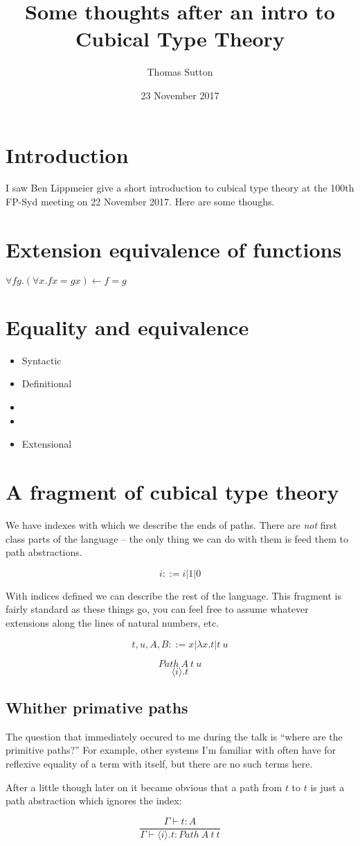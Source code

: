 \documentclass[a4paper]{article}
\title{Some thoughts after an intro to Cubical Type Theory}
\author{Thomas Sutton}
\date{23 November 2017}
\newcommand{\labs}[2]{{\lambda #1 . #2}}
\newcommand{\lapp}[2]{#1 \: #2}
\newcommand{\pabs}[2]{{\langle #1 \rangle}.{#2}}
\newcommand{\Path}[3]{{Path\:{#1}\:{#2}\:{#3}}}
\begin{document}
\maketitle

\section{Introduction}
I saw Ben Lippmeier give a short introduction to cubical type
theory\cite{DBLP:journals/corr/CohenCHM16} at the 100th FP-Syd meeting on 22 November
2017. Here are some thoughs.

\section{Extension equivalence of functions}

$\forall f g. (\forall x. f x = g x) \leftarrow f = g$

\section{Equality and equivalence}

\begin{itemize}
\item Syntactic
\item Definitional
\item
\item
\item Extensional
\end{itemize}

\section{A fragment of cubical type theory}

We have indexes with which we describe the ends of paths. There are
{\em not} first class parts of the language -- the only thing we can
do with them is feed them to path abstractions.

$$i ::= i | 1 | 0 $$

With indices defined we can describe the rest of the language. This
fragment is fairly standard as these things go, you can feel free to
assume whatever extensions along the lines of natural numbers, etc.

$$t,u,A,B ::= x | \labs{x}{t} | \lapp{t}{u} $$

$$\Path{A}{t}{u}$$
$$\pabs{i}{t}$$

\subsection{Whither primative paths}

The question that immediately occured to me during the talk is ``where
are the primitive paths?'' For example, other systems I'm familiar
with often have for reflexive equality of a term with itself, but
there are no such terms here.

After a little though later on it became obvious that a path from $t$
to $t$ is just a path abstraction which ignores the index:

$$
\frac{\Gamma \vdash t : A}{\Gamma \vdash \pabs{i}{t} : \Path{A}{t}{t}}
$$


{}

\end{document}
